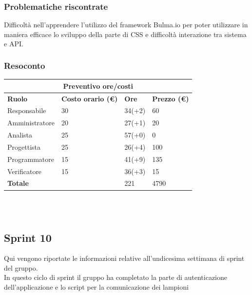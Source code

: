 \documentclass[10pt]{article}
\begin{document}
\subsubsection{Problematiche riscontrate}
Difficoltà nell’apprendere l’utilizzo del framework Bulma.io per poter utilizzare in maniera efficace lo sviluppo della parte di CSS e difficoltà interazione tra sistema e API.


\subsubsection{Resoconto}
\begin{center}
	\begin{tabularx}{\textwidth}{|X|X|X|X|}
		\hline
		\multicolumn{4}{|c|}{\textbf{Preventivo ore/costi}}                                      \\
		\hline
		\hline
		\textbf{Ruolo}  & \textbf{Costo orario (\euro)} & \textbf{Ore} & \textbf{Prezzo (\euro)} \\
		\hline
		Responsabile    & 30                            & 34(+2)       & 60                      \\
		\hline
		Amministratore  & 20                            & 27(+1)       & 20                      \\
		\hline
		Analista        & 25                            & 57(+0)       & 0                       \\
		\hline
		Progettista     & 25                            & 26(+4)       & 100                     \\
		\hline
		Programmatore   & 15                            & 41(+9)       & 135                     \\
		\hline
		Verificatore    & 15                            & 36(+3)       & 15                      \\
		\hline
		\hline
		\textbf{Totale} &                               & 221          & 4790                    \\
		\hline
	\end{tabularx}\\[8pt]
	\mbox{}\\
\end{center}

\subsection{Sprint 10}
Qui vengono riportate le informazioni relative all'undicesima settimana di sprint del gruppo. \\
In questo ciclo di sprint il gruppo ha completato la parte di autenticazione dell'applicazione e lo script per la comunicazione dei lampioni \\
\end{document}
